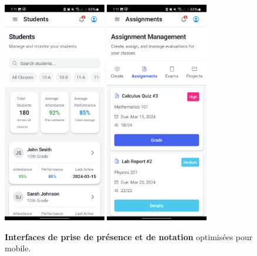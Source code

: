 \begin{figure}[H]
  \centering
  \includegraphics[width=0.4\textwidth,keepaspectratio]{pfe-pics/Mobile /Teacher/Screenshot_20250610_131112_Expo Go.jpg}
  \includegraphics[width=0.4\textwidth,keepaspectratio]{pfe-pics/Mobile /Teacher/Screenshot_20250610_131132_Expo Go.jpg}
  \caption{\textbf{Interfaces de prise de présence et de notation} optimisées pour mobile.}
  \label{fig:mobile_teacher_attendance}
\end{figure}

